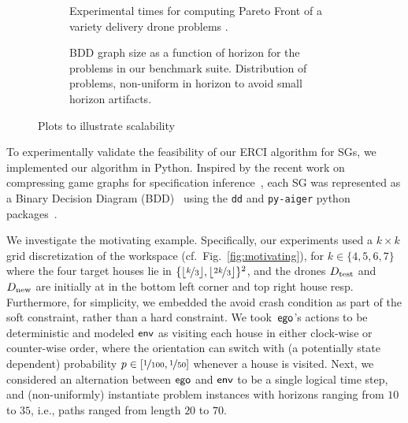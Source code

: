 \begin{figure*}
    \begin{subfigure}{0.5\textwidth}
  \centering
  \scalebox{0.58}{
    
    }
    \caption{
      Experimental times for computing Pareto Front of a variety
      delivery drone problems
      \label{fig:exp_times}.
    }
  \end{subfigure}
  \hfill
    \begin{subfigure}{0.5\textwidth}
    \centering \scalebox{0.53}{
      
    }
    \caption{
      BDD graph size as a function of horizon for the problems in our
      benchmark suite. Distribution of problems, non-uniform in horizon
      to avoid small horizon artifacts\label{fig:bdd_sizes}.
    }
  \end{subfigure}
  \caption{Plots to illustrate scalability} 
\end{figure*}

To experimentally validate the feasibility of our ERCI algorithm for
SGs, we implemented our algorithm in Python.
Inspired by the recent work on compressing game graphs for specification
inference~\cite{DBLP:conf/cav/Vazquez-Chanlatte20}, each SG was represented
as a Binary Decision Diagram (BDD)~\cite{DBLP:journals/csur/Bryant92} using the
\texttt{dd} and \texttt{py-aiger} python packages~\cite{dd, pyAiger}. 

We investigate the motivating example.
Specifically, our experiments used
a $k\times k$ grid discretization of the workspace (cf.\ Fig.~\ref{fig:motivating}), for $k \in
\{4,5,6,7\}$ where the four target houses lie in
$\{\lfloor\nicefrac{k}{3}\rfloor, \lfloor\nicefrac{2k}{3}\rfloor
\}^2$, and the drones ${D_{\text{test}}}$ and ${D_{\text{new}}}$ are initially at in the bottom left corner and top right house resp. Furthermore, for simplicity, we embedded the avoid crash
condition as part of the soft constraint, rather than a hard
constraint\footnotemark. We took~$\mathsf{ego}$'s actions to be deterministic
and modeled $\mathsf{env}$ as visiting each house in either clock-wise or
counter-wise order, where the orientation can switch with
(a potentially state dependent) probability $p \in [\nicefrac{1}{100},
\nicefrac{1}{50}]$ whenever a house is visited. Next, we considered an
alternation between $\mathsf{ego}$ and $\mathsf{env}$ to be a single logical time
step, and (non-uniformly) instantiate problem instances with horizons
ranging from $10$ to $35$, i.e., paths ranged from length $20$ to
$70$.



